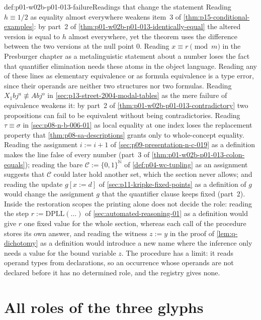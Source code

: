 \begin{hbwarning}{def:p01-w02b-p01-013-failure}{Readings that change the statement}
Reading \(h\equiv1/2\) as equality almost everywhere weakens item~3 of
\cref{thm:p15-conditional-examples}: by part~2 of
\cref{thm:p01-w02b-p01-013-identically-equal} the altered version is equal to
\(h\) almost everywhere, yet the theorem uses the difference between the two
versions at the null point \(0\).  Reading \(x\equiv r\pmod m\) in the
Presburger chapter as a metalinguistic statement about a number loses the
fact that quantifier elimination needs these atoms in the object language.
Reading any of these lines as elementary equivalence or as formula equivalence
is a type error, since their operands are neither two structures nor two
formulas.  Reading \(X_1bj^a\not\equiv Abj^o\) in
\cref{sec:p13-street-2004-modal-tables} as the mere failure of equivalence
weakens it: by part~2 of \cref{thm:p01-w02b-p01-013-contradictory} two
propositions can fail to be equivalent without being contradictories.
Reading \(\tau\equiv\sigma\) in \cref{sec:p08-n-b-006-01} as local
equality at one index loses the replacement property that
\cref{thm:p08-sa-descriptions} grants only to whole-concept equality.
Reading the assignment \(i:=i+1\) of \cref{sec:p09-presentation-n-c-019}
as a definition makes the line false of every number (part~3 of
\cref{thm:p01-w02b-p01-013-colon-equals}); reading the bare
\(\mathcal C:=\{0,1\}^{\mathbb N}\) of \cref{def:p04-wc-tupling} as an
assignment suggests that \(\mathcal C\) could later hold another set, which
the section never allows; and reading the update \(g[x:=d]\) of
\cref{sec:p11-kripke-fixed-points} as a definition of \(g\) would change the
assignment \(g\) that the quantifier clause keeps fixed (part~2).  Inside
the restoration scopes the printing alone does not decide the role: reading
the step \(r:=\mathrm{DPLL}(\ldots)\) of \cref{sec:automated-reasoning-01}
as a definition would give \(r\) one fixed value for the whole section,
whereas each call of the procedure stores its own answer, and reading the
witness \(z:=y\) in the proof of \cref{lem:q-dichotomy} as a definition
would introduce a new name where the inference only needs a value for the
bound variable \(z\).  The procedure has a limit: it reads operand types from
declarations, so an occurrence whose operands are not declared before it has
no determined role, and the registry gives none.
\end{hbwarning}

\section{All roles of the three glyphs}
\label{sec:p01-w02b-p01-013-table}

